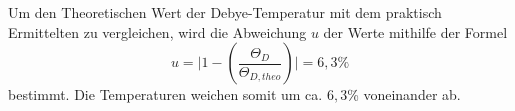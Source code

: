 Um den Theoretischen Wert der Debye-Temperatur mit dem praktisch Ermittelten zu vergleichen, wird die 
Abweichung $u$ der Werte mithilfe der Formel
\begin{equation*}
    u = \biggl| 1-\left(\frac{\Theta_{\si{D}}}{\Theta_{\si{D,theo}}}\right) \biggr| = 6,3\%
\end{equation*}
bestimmt. Die Temperaturen weichen somit um ca. $6,3$\% voneinander ab.
 
 
 
 
  
 


 



 
 
 
 
 
 

 
 




